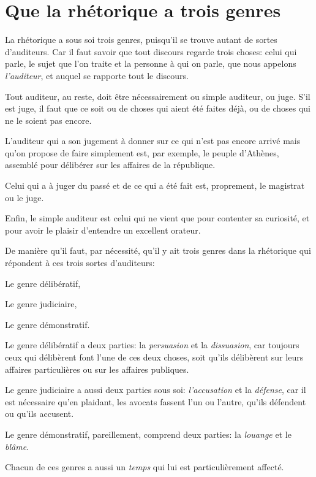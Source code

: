 
\section{Que la rhétorique a trois genres}

La rhétorique a sous soi trois genres, puisqu'il se trouve autant de sortes d'auditeurs. Car il faut savoir que
tout discours regarde trois choses: celui qui parle, le sujet que l'on traite et la personne à qui on parle, que
nous appelons \emph{l'auditeur}, et auquel se rapporte tout le discours. 

Tout auditeur, au reste, doit être nécessairement ou simple auditeur, ou juge. S'il est juge, il faut que ce soit
ou de choses qui aient été faites déjà, ou de choses qui ne le soient pas encore.

L'auditeur qui a son jugement à donner sur ce qui n'est pas encore arrivé mais qu'on propose de faire simplement
est, par exemple, le peuple d'Athènes, assemblé pour délibérer sur les affaires de la république.

Celui qui a à juger du passé et de ce qui a été fait est, proprement, le magistrat ou le juge.

Enfin, le simple auditeur est celui qui ne vient que pour contenter sa curiosité, et pour avoir le plaisir d'entendre
un excellent orateur.

De manière qu'il faut, par nécessité, qu'il y ait trois genres dans la rhétorique qui répondent à ces trois sortes
d'auditeurs:

\begin{emphpar}
Le genre délibératif,

Le genre judiciaire,

Le genre démonstratif.
\end{emphpar}

Le genre délibératif a deux parties: la \emph{persuasion} et la \emph{dissuasion}, car toujours ceux qui délibèrent font
l'une de ces deux choses, soit qu'ils délibèrent sur leurs affaires particulières ou sur les affaires publiques.

Le genre judiciaire a aussi deux parties sous soi: \emph{l'accusation} et la \emph{défense}, car il est nécessaire qu'en
plaidant, les avocats fassent l'un ou l'autre, qu'ils défendent ou qu'ils accusent.

Le genre démonstratif, pareillement, comprend deux parties: la \emph{louange} et le \emph{blâme}.

\bigbreak

Chacun de ces genres a aussi un \emph{temps} qui lui est particulièrement affecté.

